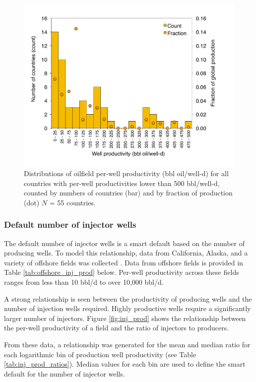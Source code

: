 \documentclass[11pt]{report}
\newcommand{\marg}[1]{{\footnotesize\textit{\textcolor{stanford}{'#1'}}}}
\newcommand{\marginnote}[1]{\marginpar{\marg{#1}}}
\begin{document}
\begin{figure}[t]
\includegraphics[width=0.8\columnwidth]{images/well_prod_low.pdf}
\caption{Distributions of oilfield per-well productivity (bbl oil/well-d) for all countries with per-well productivities lower than 500 bbl/well-d, counted by numbers of countries (bar) and by fraction of production (dot) $N$ = 55 countries.}
\label{fig:productivity_distribution_low}
\end{figure}

\subsubsection{Default number of injector wells}

The default number of injector wells is a smart default based on the number of producing wells. To model this relationship, data from California, Alaska, and a variety of offshore fields was collected \cite{DOGGR2011, AOGCC2012a}. Data from offshore fields is provided in Table \ref{tab:offshore_inj_prod} below. Per-well productivity across these fields ranges from less than 10 bbl/d to over 10,000 bbl/d.

A strong relationship is seen between the productivity of producing wells and the number of injection wells required. Highly productive wells require a significantly larger number of injectors. Figure \ref{fig:inj_prod} shows the relationship between the per-well productivity of a field and the ratio of injectors to producers.

From these data, a relationship was generated for the mean and median ratio for each logarithmic bin of production well productivity (see Table \ref{tab:inj_prod_ratios}). \marginnote{Active Field 2.2.7} Median values for each bin are used to define the smart default for the number of injector wells.
\end{document}
